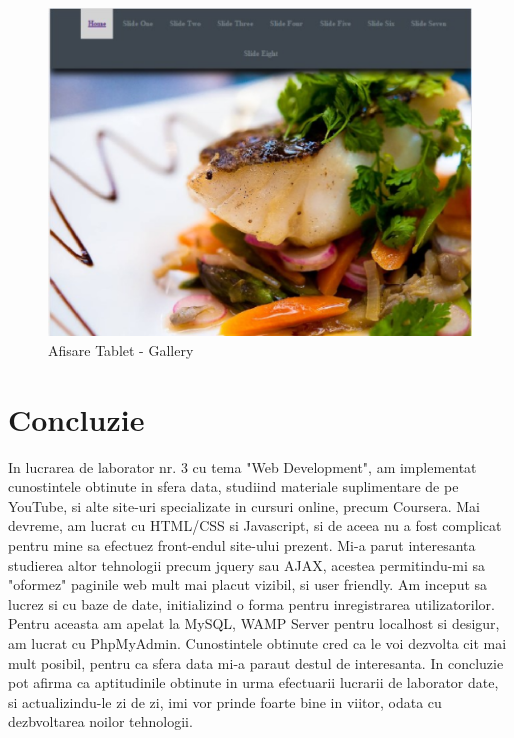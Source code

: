 \documentclass[11pt]{article}
\begin{document}
\begin{figure}[h]
\includegraphics{images/15.eps}
\caption{Afisare Tablet - Gallery}
\end{figure}

\clearpage
\section*{Concluzie}

In lucrarea de laborator nr. 3 cu tema "Web Development", am implementat cunostintele obtinute in sfera data, studiind materiale suplimentare de pe YouTube, si alte site-uri specializate in cursuri online, precum Coursera. Mai devreme, am lucrat cu HTML/CSS si Javascript, si de aceea nu a fost complicat pentru mine sa efectuez front-endul site-ului prezent. Mi-a parut interesanta studierea altor tehnologii precum jquery sau AJAX, acestea permitindu-mi sa "oformez" paginile web mult mai placut vizibil, si user friendly. 
Am inceput sa lucrez si cu baze de date, initializind o forma pentru inregistrarea utilizatorilor. Pentru aceasta am apelat la MySQL, WAMP Server pentru localhost si desigur, am lucrat cu PhpMyAdmin.
Cunostintele obtinute cred ca le voi dezvolta cit mai mult posibil, pentru ca sfera data mi-a paraut destul de interesanta.
In concluzie pot afirma ca aptitudinile obtinute in urma efectuarii lucrarii de laborator date, si actualizindu-le zi de zi, imi vor prinde foarte bine in viitor, odata cu dezbvoltarea noilor tehnologii.

\clearpage
\end{document}
